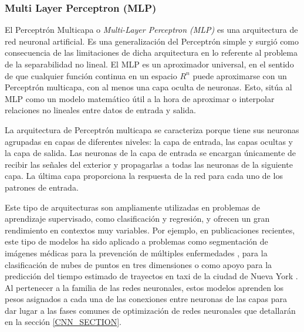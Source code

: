 \subsubsection*{Multi Layer Perceptron (MLP)}




El Perceptrón Multicapa o \textit{Multi-Layer Perceptron (MLP)} es una arquitectura de red neuronal artificial. Es una generalización del Perceptrón simple y surgió como consecuencia de las limitaciones de dicha arquitectura en lo referente al problema de la separabilidad no lineal. El MLP es un aproximador universal, en el sentido de que cualquier función continua en un espacio $R^n$ puede aproximarse con un Perceptrón multicapa, con al menos una capa oculta de neuronas. Esto, sitúa al MLP como un modelo matemático útil a la hora de aproximar o interpolar relaciones no lineales entre datos de entrada y salida.

La arquitectura de Perceptrón multicapa se caracteriza porque tiene sus neuronas agrupadas en capas de diferentes niveles: la capa de entrada, las capas ocultas y la capa de salida. Las neuronas de la capa de entrada se encargan únicamente de recibir las señales del exterior y propagarlas a todas las neuronas de la siguiente capa. La última capa proporciona la respuesta de la red para cada uno de los patrones de entrada.

Este tipo de arquitecturas son ampliamente utilizadas en problemas de aprendizaje supervisado, como clasificación y regresión, y ofrecen un gran rendimiento en contextos muy variables. Por ejemplo, en publicaciones recientes, este tipo de modelos ha sido aplicado a problemas como segmentación de imágenes médicas para la prevención de múltiples enfermedades \cite{valanarasu2022unext}, para la clasificación de nubes de puntos en tres dimensiones \cite{choe2022pointmixer} o como apoyo para la predicción del tiempo estimado de trayectos en taxi de la ciudad de Nueva York \cite{poongodi2022new}. Al pertenecer a la familia de las redes neuronales, estos modelos aprenden los pesos asignados a cada una de las conexiones entre neuronas de las capas para dar lugar a las fases comunes de optimización de redes neuronales que detallarán en la sección \ref{CNN_SECTION}.

